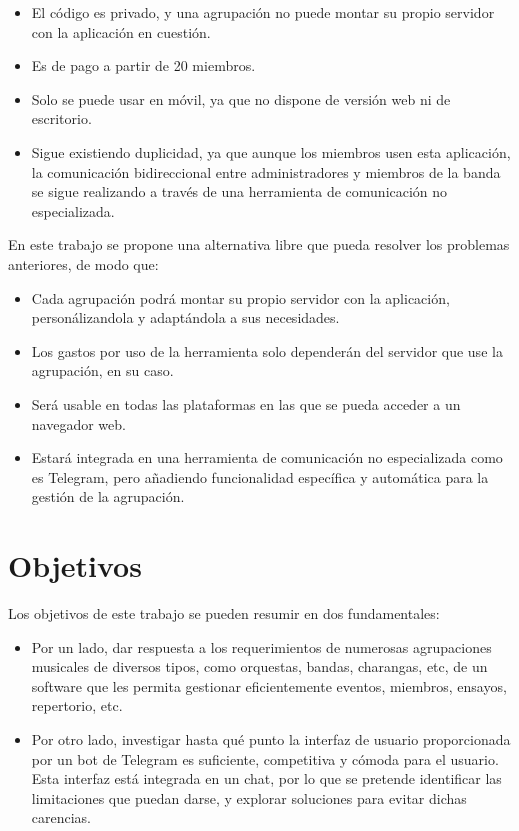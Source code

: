 \begin{itemize}
    \item El código es privado, y una agrupación no puede montar su propio servidor con la aplicación en cuestión.
    \item Es de pago a partir de 20 miembros.
    \item Solo se puede usar en móvil, ya que no dispone de versión web ni de escritorio.
    \item Sigue existiendo duplicidad, ya que aunque los miembros usen esta aplicación, la comunicación bidireccional entre administradores y miembros de la banda se sigue realizando a través de una herramienta de comunicación no especializada.
\end{itemize}

En este trabajo se propone una alternativa libre que pueda resolver los problemas anteriores, de modo que:

\begin{itemize}
    \item Cada agrupación podrá montar su propio servidor con la aplicación, personálizandola y adaptándola a sus necesidades.
    \item Los gastos por uso de la herramienta solo dependerán del servidor que use la agrupación, en su caso.
    \item Será usable en todas las plataformas en las que se pueda acceder a un navegador web.
    \item Estará integrada en una herramienta de comunicación no especializada como es Telegram, pero añadiendo funcionalidad específica y automática para la gestión de la agrupación.
\end{itemize}



\section{Objetivos}


Los objetivos de este trabajo se pueden resumir en dos fundamentales:

\begin{itemize}
    \item Por un lado, dar respuesta a los requerimientos de numerosas agrupaciones musicales de diversos tipos, como orquestas, bandas, charangas, etc, de un software que les permita gestionar eficientemente eventos, miembros, ensayos, repertorio, etc.
    \item Por otro lado, investigar hasta qué punto la interfaz de usuario proporcionada por un bot de Telegram es suficiente, competitiva y cómoda para el usuario. Esta interfaz está integrada en un chat, por lo que se pretende identificar las limitaciones que puedan darse, y explorar soluciones para evitar dichas carencias.
\end{itemize}


